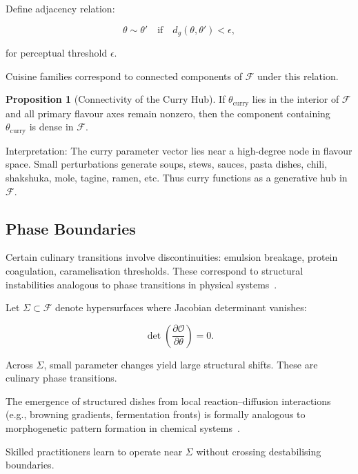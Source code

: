 \documentclass[12pt,a4paper]{article}
\theoremstyle{definition}
\newtheorem{proposition}{Proposition}[section]
\begin{document}
Define adjacency relation:

\begin{equation}
  \theta \sim \theta'
  \quad \text{if} \quad
  d_g(\theta,\theta') < \epsilon,
\end{equation}

for perceptual threshold $\epsilon$.

Cuisine families correspond to connected components of
$\mathcal{F}$ under this relation.

\begin{proposition}[Connectivity of the Curry Hub]
  If $\theta_{\mathrm{curry}}$ lies in the interior of $\mathcal{F}$
  and all primary flavour axes remain nonzero, then the component
  containing $\theta_{\mathrm{curry}}$ is dense in $\mathcal{F}$.
\end{proposition}

Interpretation:
The curry parameter vector lies near a high-degree node in flavour space.
Small perturbations generate soups, stews, sauces, pasta dishes,
chili, shakshuka, mole, tagine, ramen, etc.
Thus curry functions as a generative hub in $\mathcal{F}$.

\subsection{Phase Boundaries}

Certain culinary transitions involve discontinuities:
emulsion breakage, protein coagulation, caramelisation thresholds.
These correspond to structural instabilities analogous to
phase transitions in physical systems~\citep{stanley1971}.

Let $\Sigma \subset \mathcal{F}$ denote hypersurfaces where
Jacobian determinant vanishes:

\begin{equation}
  \det\left(\frac{\partial \mathcal{O}}{\partial \theta}\right) = 0.
\end{equation}

Across $\Sigma$, small parameter changes yield large structural shifts.
These are culinary phase transitions.

The emergence of structured dishes from local reaction–diffusion
interactions (e.g., browning gradients, fermentation fronts)
is formally analogous to morphogenetic pattern formation
in chemical systems~\citep{turing1952}.

Skilled practitioners learn to operate near $\Sigma$
without crossing destabilising boundaries.
\end{document}
